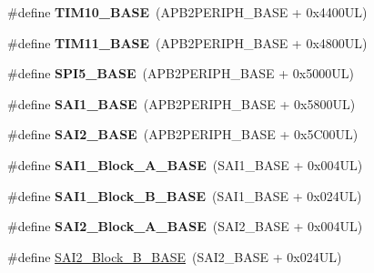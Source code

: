 \begin{DoxyCompactItemize}
\#define {\bfseries T\+I\+M10\+\_\+\+B\+A\+SE}~(A\+P\+B2\+P\+E\+R\+I\+P\+H\+\_\+\+B\+A\+SE + 0x4400\+U\+L)
\item 
\mbox{\label{group___peripheral__memory__map_ga3a4a06bb84c703084f0509e105ffaf1d}} 
\#define {\bfseries T\+I\+M11\+\_\+\+B\+A\+SE}~(A\+P\+B2\+P\+E\+R\+I\+P\+H\+\_\+\+B\+A\+SE + 0x4800\+U\+L)
\item 
\mbox{\label{group___peripheral__memory__map_gac1c58d33414e167d478ecd0e31331dfa}} 
\#define {\bfseries S\+P\+I5\+\_\+\+B\+A\+SE}~(A\+P\+B2\+P\+E\+R\+I\+P\+H\+\_\+\+B\+A\+SE + 0x5000\+U\+L)
\item 
\mbox{\label{group___peripheral__memory__map_ga24c1053b754946b512f9c31123e09d21}} 
\#define {\bfseries S\+A\+I1\+\_\+\+B\+A\+SE}~(A\+P\+B2\+P\+E\+R\+I\+P\+H\+\_\+\+B\+A\+SE + 0x5800\+U\+L)
\item 
\mbox{\label{group___peripheral__memory__map_ga4b4d5c95ea5f835f9ac37fab90a2d700}} 
\#define {\bfseries S\+A\+I2\+\_\+\+B\+A\+SE}~(A\+P\+B2\+P\+E\+R\+I\+P\+H\+\_\+\+B\+A\+SE + 0x5\+C00\+U\+L)
\item 
\mbox{\label{group___peripheral__memory__map_ga31f72e5e5d7aea23bc8a5191bc32e900}} 
\#define {\bfseries S\+A\+I1\+\_\+\+Block\+\_\+\+A\+\_\+\+B\+A\+SE}~(S\+A\+I1\+\_\+\+B\+A\+SE + 0x004\+U\+L)
\item 
\mbox{\label{group___peripheral__memory__map_gacdb59b321830def8c7a57c154178bc48}} 
\#define {\bfseries S\+A\+I1\+\_\+\+Block\+\_\+\+B\+\_\+\+B\+A\+SE}~(S\+A\+I1\+\_\+\+B\+A\+SE + 0x024\+U\+L)
\item 
\mbox{\label{group___peripheral__memory__map_gad2992b5770984ddee4c1b7e325d238f3}} 
\#define {\bfseries S\+A\+I2\+\_\+\+Block\+\_\+\+A\+\_\+\+B\+A\+SE}~(S\+A\+I2\+\_\+\+B\+A\+SE + 0x004\+U\+L)
\item 
\#define \mbox{\hyperlink{group___peripheral__memory__map_ga034a6ac8f61e4d15cd9f2f7eca140569}{S\+A\+I2\+\_\+\+Block\+\_\+\+B\+\_\+\+B\+A\+SE}}~(S\+A\+I2\+\_\+\+B\+A\+SE + 0x024\+U\+L)
\item 

\end{DoxyCompactItemize}
